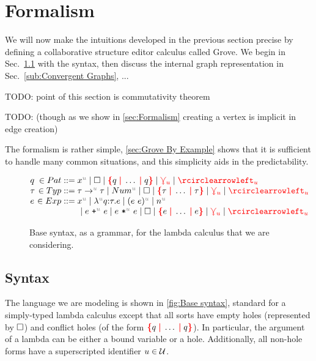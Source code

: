 
\section{Formalism}%
\label{sec:Formalism}

We will now make the intuitions developed in the previous section precise
by defining a collaborative structure editor calculus called Grove.
We begin in Sec.~\ref{sub:Syntax} with the syntax, then discuss
the internal graph representation in Sec.~\ref{sub:Convergent Graphs},
...


TODO: point of this section is commutativity theorem

TODO: (though as we show in \autoref{sec:Formalism} creating a vertex is implicit in edge creation)

The formalism is rather simple, \autoref{sec:Grove By Example} shows
that it is sufficient to handle many common situations,
and this simplicity aids in the predictability.

\begin{figure}
  \[
    \arraycolsep=0pt
    \begin{array}{lrlll}
      q    & {}\in Pat & {}::={} & x^{\id{u}} \mid \hole \mid \conflictHole{q,\ldots,q} \mid \multiVertex{u} \mid \cycleVertex{u} \\
      \tau & {}\in Typ & {}::={} & \tau \rightarrow^{\id{u}} \tau \mid Num^{\id{u}} \mid \hole \mid \conflictHole{\tau,\ldots,\tau} \mid \multiVertex{u} \mid \cycleVertex{u} \\
      e    & {}\in Exp & {}::={} & x^{\id{u}} \mid \lambda^{\id{u}} q \mathord{:}\tau.e \mid (e~e)^{\id{u}} \mid n^{\id{u}} \\
           &           &         & ~\mid e~\texttt{+}^{\id{u}}~e \mid e~\texttt{*}^{\id{u}}~e \mid \hole \mid \conflictHole{e,\ldots,e} \mid \multiVertex{u} \mid \cycleVertex{u} \\
    \end{array}
  \]
  \caption{Base syntax, as a grammar, for the lambda calculus that we are considering.}
  \label{fig:Base syntax}
\end{figure}

\subsection{Syntax}%
\label{sub:Syntax}

The language we are modeling is shown in \autoref{fig:Base syntax}, standard for a simply-typed lambda calculus except that all sorts have empty holes (represented by $\square$) and conflict holes (of the form $\conflictHole{q,\ldots,q}$).
In particular, the argument of a lambda can be either a bound variable or a hole.
Additionally, all non-hole forms have a superscripted identifier $u \in \mathcal{U}$.

